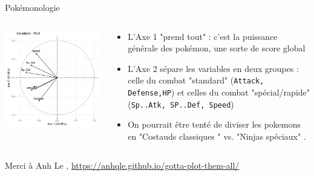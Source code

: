 \documentclass{beamer}
\begin{document}
\begin{frame}{Pokémonologie}


\begin{columns}[T,onlytextwidth]

\includegraphics[width=\textwidth,keepaspectratio]{img/cercle_trigo_ACP_var.png}


\begin{small}  
\begin{itemize}
\item L'Axe 1 "prend tout" : c'est la puissance générale des pokémon, une sorte de \alert{score global}
\item L'Axe 2 sépare les variables en \alert{deux groupes} : celle du  combat "standard" (\texttt{Attack, Defense,HP}) et celles du combat "spécial/rapide" (\texttt{Sp..Atk, SP..Def, Speed})
\item On pourrait être tenté de diviser les pokemons en "Costauds classiques " vs. "Ninjas spéciaux" . 
\end{itemize}
\end{small}

\end{columns}

\medskip  
\medskip  \medskip  \medskip  \medskip  
\begin{tiny}
Merci à Anh Le , \url{https://anhqle.github.io/gotta-plot-them-all/}
\end{tiny}


\end{frame}
\end{document}
